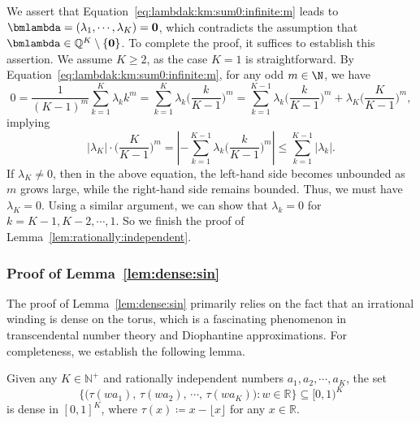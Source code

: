 \documentclass[11pt,a4paper]{article}
\let\ldots\cdots
\let\dots\cdots
\begin{document}
We assert that Equation~\eqref{eq:lambdak:km:sum0:infinite:m} leads to \(\bmlambda = (\lambda_1, \cdots, \lambda_K) = \bmzero\), which contradicts the assumption that \(\bmlambda \in \mathbb{Q}^K \setminus \{\bmzero\}\). To complete the proof, it suffices to establish this assertion. We assume \(K \ge 2\), as the case \(K = 1\) is straightforward.
By Equation~\eqref{eq:lambdak:km:sum0:infinite:m},
for any odd $m\in \N$, we have
    \begin{equation*}
    0=\frac{1}{(K-1)^m}\sum_{k=1}^K \lambda_k k^m
    =\sum_{k=1}^K \lambda_k \Big(\frac{k}{K-1}\Big)^m
    =\sum_{k=1}^{K-1} \lambda_k \Big(\frac{k}{K-1}\Big)^m +  \lambda_K\Big(\frac{K}{K-1}\Big)^m,
\end{equation*}
implying
    \begin{equation*}
    |\lambda_K|\cdot\Big(\frac{K}{K-1}\Big)^m=
    \left| -\sum_{k=1}^{K-1} \lambda_k \Big(\frac{k}{K-1}\Big)^m\right|\le \sum_{k=1}^{K-1} |\lambda_k|.
\end{equation*}
If \(\lambda_K \neq 0\), then in the above equation, the left-hand side becomes unbounded as \(m\) grows large, while the right-hand side remains bounded.  Thus, we must have \(\lambda_K = 0\). Using a similar argument, we can show that \(\lambda_k = 0\) for \(k = K-1, K-2, \ldots, 1\).
So we finish the proof of Lemma~\ref{lem:rationally:independent}.




\subsubsection{Proof of Lemma~\ref{lem:dense:sin}}
\label{sec:proof:lem:dense:sin}

The proof of Lemma~\ref{lem:dense:sin} primarily relies on the fact that an irrational winding is dense on the torus, which is a fascinating phenomenon in transcendental number theory and Diophantine approximations. For completeness, we establish the following lemma.

\begin{lemma}
\label{lem:dense:decimal}
Given any \( K \in \mathbb{N}^+ \) and rationally independent numbers \( a_1, a_2, \dots, a_K \), the set
\begin{equation*}
    \Big\{ \Big(\tau(wa_1), \, \tau(wa_2), \, \cdots, \, \tau(wa_K)\Big) : w \in \mathbb{R} \Big\} \subseteq [0,1)^K
\end{equation*}
is dense in \( [0,1]^K \), where \( \tau(x) \coloneqq x - \lfloor x \rfloor \) for any \( x \in \mathbb{R} \).
\end{lemma}
\end{document}
